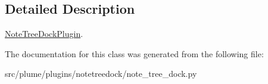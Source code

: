 \subsection{Detailed Description}
\hyperlink{classplume-creator_1_1src_1_1plume_1_1plugins_1_1notetreedock_1_1note__tree__dock_1_1_note_tree_dock_plugin}{Note\+Tree\+Dock\+Plugin}. 

The documentation for this class was generated from the following file\+:\begin{DoxyCompactItemize}
\item 
src/plume/plugins/notetreedock/note\+\_\+tree\+\_\+dock.\+py\end{DoxyCompactItemize}
